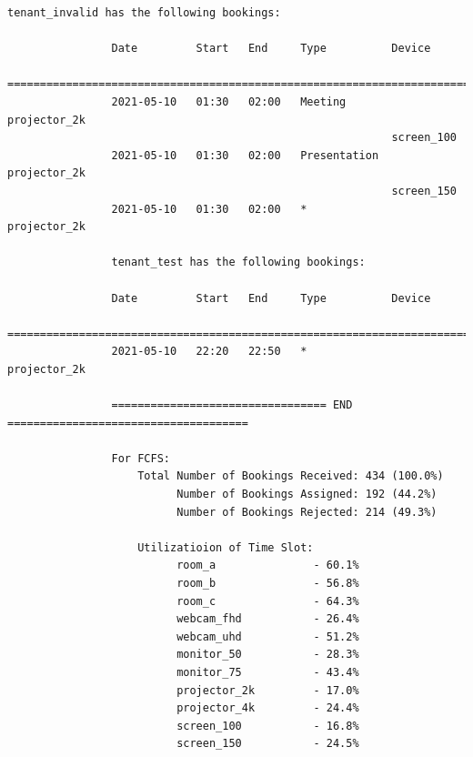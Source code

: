\documentclass{article}
\begin{document}
\begin{Verbatim}[gobble=8]
                tenant_invalid has the following bookings:
                
                Date         Start   End     Type          Device
                ===========================================================================
                2021-05-10   01:30   02:00   Meeting       projector_2k
                                                           screen_100
                2021-05-10   01:30   02:00   Presentation  projector_2k
                                                           screen_150
                2021-05-10   01:30   02:00   *             projector_2k
                
                tenant_test has the following bookings:
                
                Date         Start   End     Type          Device
                ===========================================================================
                2021-05-10   22:20   22:50   *             projector_2k
                
                ================================= END =====================================
                
                For FCFS:
                    Total Number of Bookings Received: 434 (100.0%)
                          Number of Bookings Assigned: 192 (44.2%)
                          Number of Bookings Rejected: 214 (49.3%)
                
                    Utilizatioion of Time Slot:
                          room_a               - 60.1%
                          room_b               - 56.8%
                          room_c               - 64.3%
                          webcam_fhd           - 26.4%
                          webcam_uhd           - 51.2%
                          monitor_50           - 28.3%
                          monitor_75           - 43.4%
                          projector_2k         - 17.0%
                          projector_4k         - 24.4%
                          screen_100           - 16.8%
                          screen_150           - 24.5%
                

\end{Verbatim}
\end{document}
